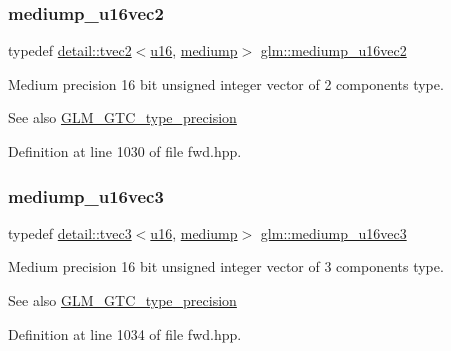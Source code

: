 \subsubsection{\texorpdfstring{mediump\+\_\+u16vec2}{mediump\_u16vec2}}
{\footnotesize\ttfamily typedef \hyperlink{structglm_1_1detail_1_1tvec2}{detail\+::tvec2}$<$\hyperlink{group__gtc__type__precision_gae7a1571503f83d2264ddfa705a6b082a}{u16}, \hyperlink{namespaceglm_a0f04f086094c747d227af4425893f545a6416f3ea0c9025fb21ed50c4d6620482}{mediump}$>$ \hyperlink{group__gtc__type__precision_ga93fe5ddc21391f0334eb3a60b76c390b}{glm\+::mediump\+\_\+u16vec2}}

Medium precision 16 bit unsigned integer vector of 2 components type. \begin{DoxySeeAlso}{See also}
\hyperlink{group__gtc__type__precision}{G\+L\+M\+\_\+\+G\+T\+C\+\_\+type\+\_\+precision} 
\end{DoxySeeAlso}


Definition at line 1030 of file fwd.\+hpp.

\mbox{\label{group__gtc__type__precision_ga82dbfd263ced8d03577008a3ef096598}} 
\subsubsection{\texorpdfstring{mediump\+\_\+u16vec3}{mediump\_u16vec3}}
{\footnotesize\ttfamily typedef \hyperlink{structglm_1_1detail_1_1tvec3}{detail\+::tvec3}$<$\hyperlink{group__gtc__type__precision_gae7a1571503f83d2264ddfa705a6b082a}{u16}, \hyperlink{namespaceglm_a0f04f086094c747d227af4425893f545a6416f3ea0c9025fb21ed50c4d6620482}{mediump}$>$ \hyperlink{group__gtc__type__precision_ga82dbfd263ced8d03577008a3ef096598}{glm\+::mediump\+\_\+u16vec3}}

Medium precision 16 bit unsigned integer vector of 3 components type. \begin{DoxySeeAlso}{See also}
\hyperlink{group__gtc__type__precision}{G\+L\+M\+\_\+\+G\+T\+C\+\_\+type\+\_\+precision} 
\end{DoxySeeAlso}


Definition at line 1034 of file fwd.\+hpp.

\mbox{\label{group__gtc__type__precision_gaad8b540f4231f69823c39fe9dfcb945a}} 
